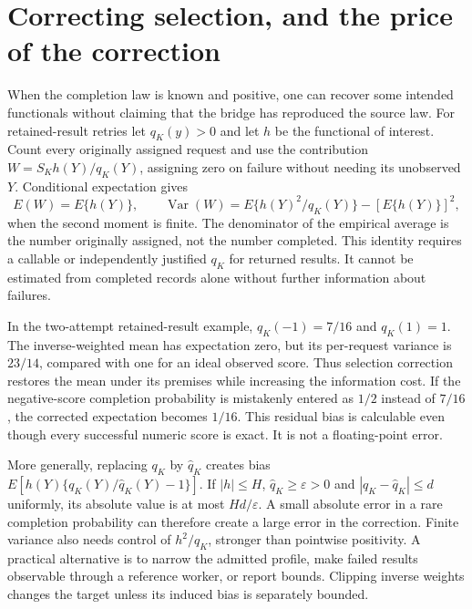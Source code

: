 \section{Correcting selection, and the price of the correction}
\label{exec17:s9-selection-correction}

When the completion law is known and positive, one can recover some intended
functionals without claiming that the bridge has reproduced the source law.
For retained-result retries let $q_K(y)>0$ and let $h$ be the functional of
interest. Count every originally assigned request and use the contribution
$W=S_K h(Y)/q_K(Y)$, assigning zero on failure without needing its unobserved
$Y$. Conditional expectation gives
\begin{equation}
 E(W)=E\{h(Y)\},\qquad
 \operatorname{Var}(W)=E\{h(Y)^2/q_K(Y)\}-[E\{h(Y)\}]^2,
 \label{exec17:s9-inverse-selection}
\end{equation}
when the second moment is finite. The denominator of the empirical average
is the number originally assigned, not the number completed. This identity
requires a callable or independently justified $q_K$ for returned results.
It cannot be estimated from completed records alone without further
information about failures.

In the two-attempt retained-result example, $q_K(-1)=7/16$ and $q_K(1)=1$.
The inverse-weighted mean has expectation zero, but its per-request variance
is $23/14$, compared with one for an ideal observed score. Thus selection
correction restores the mean under its premises while increasing the
information cost. If the negative-score completion probability is mistakenly
entered as $1/2$ instead of $7/16$, the corrected expectation becomes $1/16$.
This residual bias is calculable even though every successful numeric score
is exact. It is not a floating-point error.

More generally, replacing $q_K$ by $\widehat q_K$ creates bias
$E[h(Y)\{q_K(Y)/\widehat q_K(Y)-1\}]$. If $|h|\leq H$,
$\widehat q_K\geq\varepsilon>0$ and
$|q_K-\widehat q_K|\leq d$ uniformly, its absolute value is at most
$Hd/\varepsilon$. A small absolute error in a rare completion probability
can therefore create a large error in the correction. Finite variance also
needs control of $h^2/q_K$, stronger than pointwise positivity. A practical
alternative is to narrow the admitted profile, make failed results observable
through a reference worker, or report bounds. Clipping inverse weights changes
the target unless its induced bias is separately bounded.

